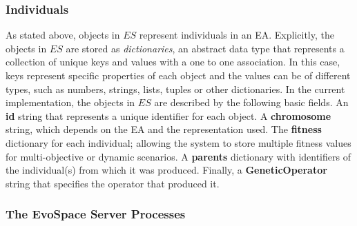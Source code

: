 \subsubsection{Individuals}
As stated above, objects in $ES$ represent individuals in an EA.
Explicitly, the objects in $ES$ are stored as \emph{dictionaries}, an abstract data type that represents a collection
of unique keys and values with a one to one association.
In this case, keys represent specific properties of each object and the values can be of different types, such as
numbers, strings, lists, tuples or other dictionaries.
In the current implementation, the objects in $ES$ are described by the following basic fields.
An \textbf{id} string that represents a unique identifier for each object.
A \textbf{chromosome} string, which depends on the EA and the representation used.
The \textbf{fitness} dictionary for each individual; allowing the system to store multiple fitness values for multi-objective or dynamic scenarios.
A \textbf{parents} dictionary with identifiers of the individual(s) from which it was produced.
Finally, a \textbf{GeneticOperator}  string that specifies the
operator that produced it. %


\subsubsection{The EvoSpace Server Processes}

